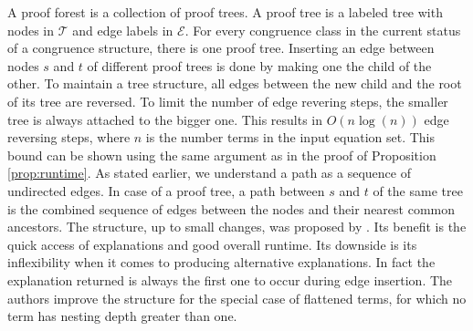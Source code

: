 A proof forest is a collection of proof trees.
A proof tree is a labeled tree with nodes in $\mathcal{T}$ and edge labels in $\mathcal{E}$.
For every congruence class in the current status of a congruence structure, there is one proof tree.
Inserting an edge between nodes $s$ and $t$ of different proof trees is done by making one the child of the other.
To maintain a tree structure, all edges between the new child and the root of its tree are reversed.
To limit the number of edge revering steps, the smaller tree is always attached to the bigger one.
This results in $O(n \log(n))$ edge reversing steps, where $n$ is the number terms in the input equation set.
This bound can be shown using the same argument as in the proof of Proposition \ref{prop:runtime}.
As stated earlier, we understand a path as a sequence of undirected edges.
In case of a proof tree, a path between $s$ and $t$ of the same tree is the combined sequence of edges between the nodes and their nearest common ancestors.
The structure, up to small changes, was proposed by \cite{Nieuwenhuis2005,Nieuwenhuis2007}.
Its benefit is the quick access of explanations and good overall runtime.
Its downside is its inflexibility when it comes to producing alternative explanations.
In fact the explanation returned is always the first one to occur during edge insertion.
The authors improve the structure for the special case of flattened terms, for which no term has nesting depth greater than one.





